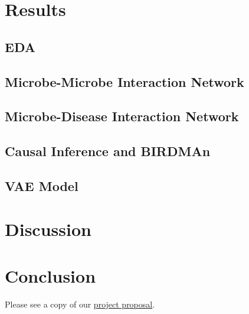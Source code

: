 \documentclass[12pt,letterpaper]{article}
\begin{document}
\section{Results}

\subsection{EDA}

\subsection{Microbe-Microbe Interaction Network}

\subsection{Microbe-Disease Interaction Network}

\subsection{Causal Inference and BIRDMAn}

\subsection{VAE Model}

\section{Discussion}

\section{Conclusion}


\clearpage
\makereference





\clearpage
\makeappendix

Please see a copy of our \href{https://drive.google.com/file/d/1fEGpmoSULPbpG6bcopPBKdlyF6gG_Gv_/view?usp=sharing}{project proposal}. 
\end{document}
